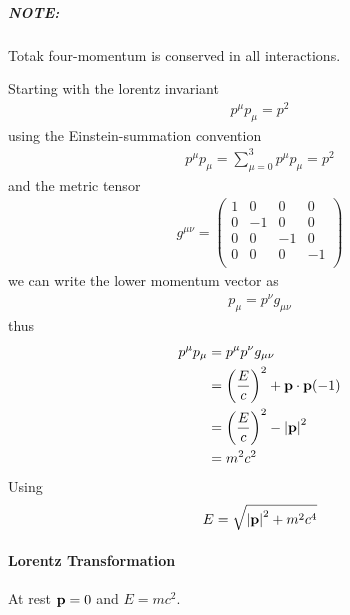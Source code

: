 \documentclass[../main.tex]{subfiles}
\begin{document}
\subparagraph*{NOTE:} Totak four-momentum is conserved in all interactions.

Starting with the lorentz invariant
\begin{align*}
    p^\mu p_\mu = p^2
\end{align*}
using the Einstein-summation convention
\begin{align*}
    p^\mu p_\mu = \sum_{\mu = 0}^3 p^\mu p_\mu = p^2
\end{align*}
and the metric tensor
\begin{align*}
    g^{\mu\nu} = \begin{pmatrix}
        1 & 0 & 0 & 0 \\
        0 & -1 & 0 & 0 \\
        0 & 0 & -1 & 0 \\
        0 & 0 & 0 & -1 \\
    \end{pmatrix}
\end{align*}
we can write the lower momentum vector as
\begin{align*}
    p_\mu = p^\nu g_{\mu\nu} 
\end{align*}
thus
\begin{align*}
    p^\mu p_\mu &= p^\mu p^\nu g_{\mu\nu} \\
    &= \qt(\frac{E}{c})^2 + \vb{p} \cdot \vb{p} (-1) \\
    &= \qt(\frac{E}{c})^2 - \abs{\vb{p}}^2 \\
    &= m^2 c^2
\end{align*}
Using
\begin{align}
    E = \sqrt{\abs{\vb{p}}^2 + m^2 c^4}
\end{align}

\paragraph{Lorentz Transformation} At rest $\vb{p} = 0$ and $E = mc^2$.
\end{document}
